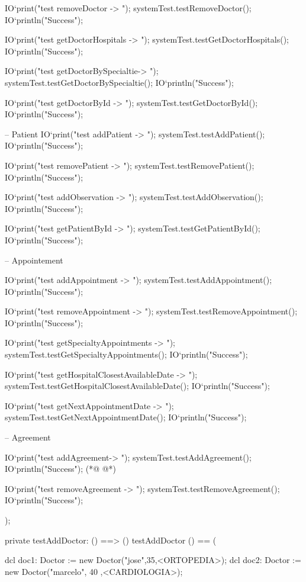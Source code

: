 \begin{vdmpp}[breaklines=true]
  IO`print("test removeDoctor -> ");
  systemTest.testRemoveDoctor();
  IO`println("Success");
  
  IO`print("test getDoctorHospitals -> ");
  systemTest.testGetDoctorHospitals();
  IO`println("Success");
  
  IO`print("test getDoctorBySpecialtie-> ");
  systemTest.testGetDoctorBySpecialtie();
  IO`println("Success");
  
  IO`print("test getDoctorById -> ");
  systemTest.testGetDoctorById();
  IO`println("Success");
  
  -- Patient
  IO`print("test addPatient -> ");
  systemTest.testAddPatient();
  IO`println("Success");
  
  IO`print("test removePatient -> ");
  systemTest.testRemovePatient();
  IO`println("Success");
  
  IO`print("test addObservation -> ");
  systemTest.testAddObservation();
  IO`println("Success");
  
  IO`print("test getPatientById -> ");
  systemTest.testGetPatientById();
  IO`println("Success");
  
  
  -- Appointement
  
  IO`print("test addAppointment -> ");
  systemTest.testAddAppointment();
  IO`println("Success");
    
  IO`print("test removeAppointment -> ");
  systemTest.testRemoveAppointment();
  IO`println("Success");
  
  IO`print("test getSpecialtyAppointments -> ");
  systemTest.testGetSpecialtyAppointments();
  IO`println("Success");
  
  IO`print("test getHospitalClosestAvailableDate -> ");
  systemTest.testGetHospitalClosestAvailableDate();
  IO`println("Success");
  
  IO`print("test getNextAppointmentDate -> ");
  systemTest.testGetNextAppointmentDate();
  IO`println("Success");
  
  -- Agreement
  
  IO`print("test addAgreement-> ");
  systemTest.testAddAgreement();
  IO`println("Success");
(*@
\label{testAddDoctor:137}
@*)
    
  IO`print("test removeAgreement -> ");
  systemTest.testRemoveAgreement();
  IO`println("Success");
   
);


private testAddDoctor: () ==> ()
 testAddDoctor () == (
 
  dcl doc1: Doctor := new Doctor("jose",35,<ORTOPEDIA>);
  dcl doc2: Doctor := new Doctor("marcelo", 40 ,<CARDIOLOGIA>);
  

\end{vdmpp}
